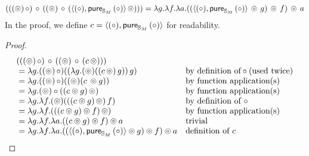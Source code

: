 \begin{lemma}\label{lemma:comp_comp_law}
$$
(((\circledcirc)\, \circ)\, \circ\, ((\circledcirc)\, \circ\, (\langle (\circ), \mathsf{pure}_{\mathbb{S}_{M}}\,(\circ) \rangle\, \circledcirc))) = \lambda g. \lambda f. \lambda a. ( ( \langle (\circ), \mathsf{pure}_{\mathbb{S}_{M}}\,(\circ) \rangle\, \circledcirc\, g )\, \circledcirc\, f )\, \circledcirc\, a
$$
In the proof, we define $c = \langle (\circ), \mathsf{pure}_{\mathbb{S}_{M}}\,(\circ) \rangle$ for readability.
\end{lemma}
\begin{proof}
$$
\begin{array}{ll}
(((\circledcirc)\, \circ)\, \circ\, ((\circledcirc)\, \circ\, (c\, \circledcirc)))\\
{}= \lambda g. ((\circledcirc)\, \circ) ((\lambda g . (\circledcirc) ((c\, \circledcirc)\, g))\, g)
&\mbox{by definition of}\circ\mbox{(used twice)}\\
{}= \lambda g. ((\circledcirc)\, \circ) ((\circledcirc) (c\, \circledcirc g))
&\mbox{by function application(s)}\\
{}= \lambda g. (\circledcirc) \circ ((c \circledcirc g)\, \circledcirc)
&\mbox{by function application(s)}\\
{}= \lambda g. \lambda f . (\circledcirc) (((c \circledcirc g)\, \circledcirc)\, f)
&\mbox{by definition of }\circ\\
{}= \lambda g. \lambda f . (((c \circledcirc g) \circledcirc f)\, \circledcirc) 
&\mbox{by function application(s)}\\
{}= \lambda g. \lambda f . \lambda a . ((c \circledcirc g)\circledcirc f) \circledcirc a
&\mbox{trivial}\\
{}= \lambda g. \lambda f . \lambda a . ((\langle (\circ), \mathsf{pure}_{\mathbb{S}_{M}}\,(\circ) \rangle \circledcirc g)\circledcirc f) \circledcirc a
&\mbox{definition of }c\\
\end{array}
$$
\end{proof}

